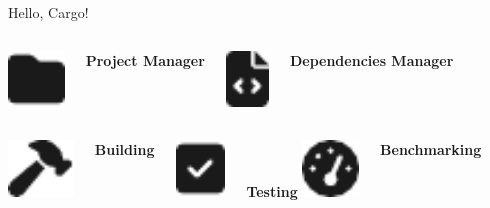     \begin{frame}{Hello, Cargo!}
        \begin{columns}[t, onlytextwidth]
                \centering
                \includegraphics[height=1.5cm, keepaspectratio]{images/folder.pdf}

                \textbf{Project Manager}

                \centering
                \includegraphics[height=1.5cm, keepaspectratio]{images/file-code.pdf}

                \textbf{Dependencies Manager}
        \end{columns}

        \vspace{1cm}

        \begin{columns}[t, onlytextwidth]
                \centering
                \includegraphics[height=1.5cm, keepaspectratio]{images/hammer.pdf}

                \textbf{Building}

                \centering
                \includegraphics[height=1.5cm, keepaspectratio]{images/square-check.pdf}

                \textbf{Testing}
                \centering
                \includegraphics[height=1.5cm, keepaspectratio]{images/gauge.pdf}

                \textbf{Benchmarking}
        \end{columns}
    \end{frame}

